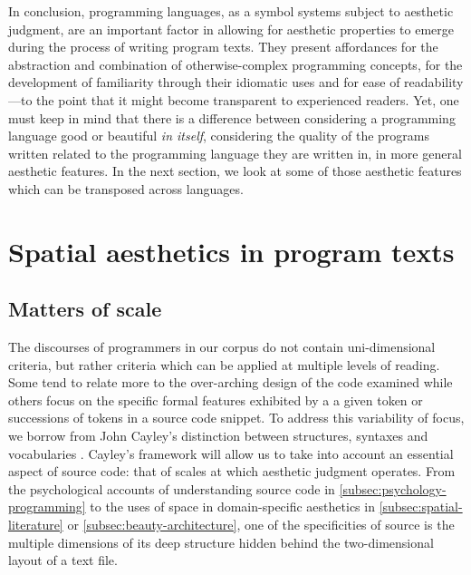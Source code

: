 
\spacer

In conclusion, programming languages, as a symbol systems subject to aesthetic judgment, are an important factor in allowing for aesthetic properties to emerge during the process of writing program texts. They present affordances for the abstraction and combination of otherwise-complex programming concepts, for the development of familiarity through their idiomatic uses and for ease of readability—to the point that it might become transparent to experienced readers. Yet, one must keep in mind that there is a difference between considering a programming language good or beautiful \emph{in itself}, considering the quality of the programs written related to the programming language they are written in, in more general aesthetic features. In the next section, we look at some of those aesthetic features which can be transposed across languages.

\section{Spatial aesthetics in program texts}
\label{sec:spatial-aesthetics}


\subsection{Matters of scale}
\label{subsec:matters-of-scale}

The discourses of programmers in our corpus do not contain uni-dimensional criteria, but rather criteria which can be applied at multiple levels of reading. Some tend to relate more to the over-arching design of the code examined while others focus on the specific formal features exhibited by a a given token or successions of tokens in a source code snippet. To address this variability of focus, we borrow from John Cayley's distinction between structures, syntaxes and vocabularies \citep{cayley_code_2012}.  Cayley's framework will allow us to take into account an essential aspect of source code: that of scales at which aesthetic judgment operates. From the psychological accounts of understanding source code in \ref{subsec:psychology-programming} to the uses of space in domain-specific aesthetics in \ref{subsec:spatial-literature} or \ref{subsec:beauty-architecture}, one of the specificities of source is the multiple dimensions of its deep structure hidden behind the two-dimensional layout of a text file.

